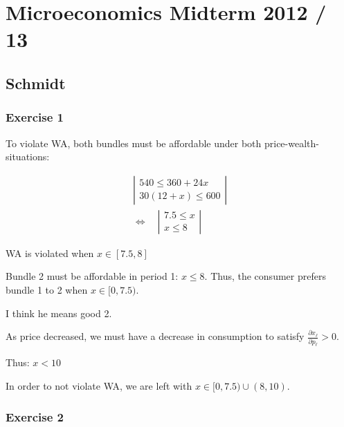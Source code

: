 \section{Microeconomics Midterm 2012 / 13}

{
\subsection*{Schmidt}

\subsubsection*{Exercise 1}

\begin{enumerate}[label=(\alph*)]
{\item 
To violate WA, both bundles must be affordable under both price-wealth-situations:

\begin{align*}
    \left|\begin{array}{c}
    540 \leqslant 360+24 x \\
    30(12+x) \leqslant 600
    \end{array}\right| \\
    \Leftrightarrow \quad\left|\begin{array}{c}
    7.5 \leq x \\
    x \leq 8
    \end{array}\right|
\end{align*}

WA is violated when $x \in[7.5,8]$
}
{\item 
Bundle 2 must be affordable in period 1: $x \leq 8$.
Thus, the consumer prefers bundle 1 to 2 when $x \in[0,7.5)$.
}
{\item 
\color{red} I think he means good 2. \color{black}

As price decreased, we must have a decrease in consumption to satisfy $\frac{\partial x_\ell}{\partial p_\ell}>0$.

Thus: $x<10$

In order to not violate WA, we are left with $x \in[0,7.5) \cup (8,10)$.
}
\end{enumerate}
}

\subsubsection*{Exercise 2}

